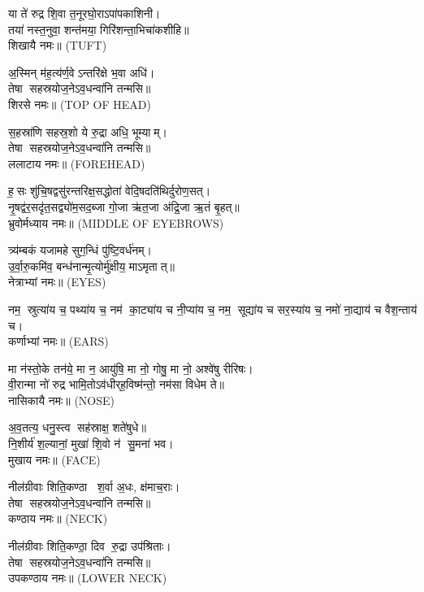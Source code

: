 
 या ते॑ रुद्र शि॒वा त॒नूरघो॒राऽपा॑पकाशिनी।\\
 तया॑ नस्त॒नुवा॒ शन्त॑मया॒ गिरि॑शन्ता॒भिचा॑कशीहि॥\\ शिखायै नमः॥ {\scriptsize (TUFT)}

अ॒स्मिन् म॑ह॒त्य॑र्ण॒वेऽन्तरि॑क्षे भ॒वा अधि॑।\\
 तेषा सहस्रयोज॒नेऽव॒धन्वा॑नि तन्मसि॥ \\
शिरसे नमः॥ {\scriptsize (TOP OF HEAD)}

स॒हस्रा॑णि सहस्र॒शो ये रु॒द्रा अधि॒ भूम्याम्।\\
 तेषा सहस्रयोज॒नेऽव॒धन्वा॑नि तन्मसि॥\\
ललाटाय नमः॥ {\scriptsize (FOREHEAD)}

ह॒सः शु॑चि॒षद्वसु॑रन्तरिक्ष॒सद्धोता॑ वेदि॒षदति॑थिर्दुरोण॒सत्।\\
नृ॒षद्व॑र॒सदृ॑त॒सद्व्यो॑म॒सद॒ब्जा गो॒जा ऋ॑त॒जा अ॑द्रि॒जा ऋ॒तं बृ॒हत्॥\\
भ्रुवोर्मध्याय नमः॥ {\scriptsize (MIDDLE OF EYEBROWS)}


त्र्य॑म्बकं यजामहे सुग॒न्धिं पु॑ष्टि॒वर्ध॑नम्।\\
 उ॒र्वा॒रु॒कमि॑व॒ बन्ध॑नान्मृ॒त्योर्मु॑क्षीय॒ माऽमृतात्॥\\
नेत्राभ्यां नमः॥ {\scriptsize (EYES)}

नम॒ स्रुत्या॑य च॒ पथ्या॑य च॒ नम॑ का॒ट्या॑य च नी॒प्या॑य च॒ %
 नम॒ सूद्या॑य च सर॒स्या॑य च॒ नमो॑ ना॒द्याय॑ च वैश॒न्ताय॑ च।\\
कर्णाभ्यां नमः॥ {\scriptsize (EARS)}

मा न॑स्तो॒के तन॑ये॒ मा न॒ आयु॑षि॒ मा नो॒ गोषु॒ मा नो॒ अश्वे॑षु रीरिषः।\\
 वी॒रान्मा नो॑ रुद्र भामि॒तोऽव॑धीर्‌ह॒विष्म॑न्तो॒ नम॑सा विधेम ते॥ \\
नासिकायै नमः॥ {\scriptsize (NOSE)}

अ॒व॒तत्य॒ धनु॒स्त्व सह॑स्राक्ष॒ शते॑षुधे॥\\
 नि॒शीर्य॑ श॒ल्यानां॒ मुखा॑ शि॒वो न॑ सु॒मना॑ भव।\\
मुखाय नमः॥ {\scriptsize (FACE)}

 नील॑ग्रीवाः शिति॒कण्ठा श॒र्वा अ॒धः, क्ष॑माच॒राः।\\
 तेषा सहस्रयोज॒नेऽव॒धन्वा॑नि तन्मसि॥\\
कण्ठाय नमः॥ {\scriptsize (NECK)}

नील॑ग्रीवाः शिति॒कण्ठा॒ दिव रु॒द्रा उप॑श्रिताः।\\
 तेषा सहस्रयोज॒नेऽव॒धन्वा॑नि तन्मसि॥\\
उपकण्ठाय नमः॥ {\scriptsize (LOWER NECK)}

